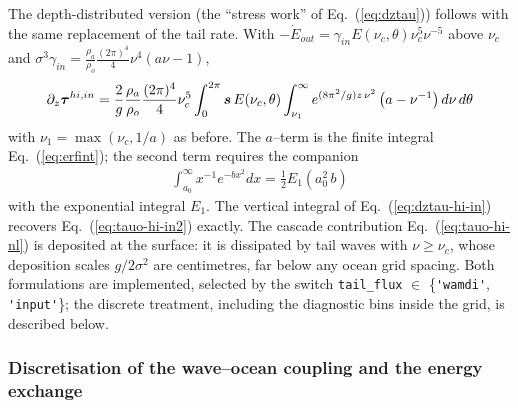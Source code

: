 \documentclass[12pt]{article}
\newcommand{\beq}  { \begin{eqnarray} }
\newcommand{\eeq}  { \end{eqnarray}}
\newcommand{\eq }  [1]{Eq.~(\ref{#1})}  %
\renewcommand{\v}[1]{{\mbox{\boldmath$ #1 $}}}  %
\newcommand{\p}{{\partial}}
\begin{document}
The depth-distributed version (the ``stress work'' of \eq{eq:dztau}) follows
with the same replacement of the tail rate. With
$-\dot E_{out} = \gamma_{in} E(\nu_c,\theta) \nu_c^5 \nu^{-5}$ above $\nu_c$ and
$\sigma^3 \gamma_{in} = \frac{\rho_a}{\rho_o} \frac{(2\pi)^4}{4}
\nu^4 (a \nu - 1)$,
\beq \label{eq:dztau-hi-in}
 \p_z \v \tau^{hi,in} = \frac{2}{g} \frac{\rho_a}{\rho_o}
 \frac{(2\pi)^4}{4} \nu_c^5 \int_0^{2\pi} \v s\, E(\nu_c,\theta)
 \int_{\nu_1}^\infty e^{ (8\pi^2/g) z\, \nu^2 }
 \left( a - \nu^{-1} \right) d\nu\, d\theta
\eeq
with $\nu_1 = \max(\nu_c, 1/a)$ as before. The $a$--term is the finite integral
\eq{eq:erfint}; the second term requires the companion
\beq \label{eq:e1int}
 \int_{a_0}^{\infty} x^{-1} e^{-b x^2} dx = \frac{1}{2} E_1( a_0^2\, b )
\eeq
with the exponential integral $E_1$. The vertical integral of
\eq{eq:dztau-hi-in} recovers \eq{eq:tauo-hi-in2} exactly. The cascade
contribution \eq{eq:tauo-hi-nl} is deposited at the surface: it is
dissipated by tail waves with $\nu \ge \nu_c$, whose deposition scales
$g/2\sigma^2$ are centimetres, far below any ocean grid spacing. Both
formulations are implemented, selected by the switch \verb|tail_flux|
$\in$ \{\verb|'wamdi'|, \verb|'input'|\}; the discrete treatment, including
the diagnostic bins inside the grid, is described below.

\subsubsection*{Discretisation of the wave--ocean coupling and the energy exchange}
\end{document}
